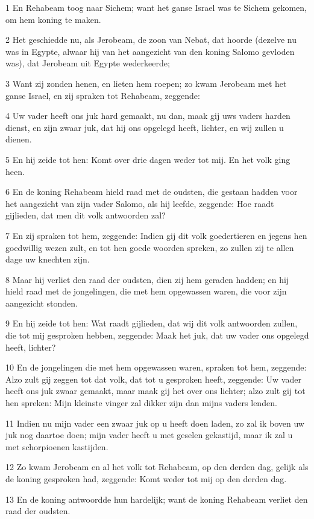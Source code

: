 \par 1 En Rehabeam toog naar Sichem; want het ganse Israel was te Sichem gekomen, om hem koning te maken.
\par 2 Het geschiedde nu, als Jerobeam, de zoon van Nebat, dat hoorde (dezelve nu was in Egypte, alwaar hij van het aangezicht van den koning Salomo gevloden was), dat Jerobeam uit Egypte wederkeerde;
\par 3 Want zij zonden henen, en lieten hem roepen; zo kwam Jerobeam met het ganse Israel, en zij spraken tot Rehabeam, zeggende:
\par 4 Uw vader heeft ons juk hard gemaakt, nu dan, maak gij uws vaders harden dienst, en zijn zwaar juk, dat hij ons opgelegd heeft, lichter, en wij zullen u dienen.
\par 5 En hij zeide tot hen: Komt over drie dagen weder tot mij. En het volk ging heen.
\par 6 En de koning Rehabeam hield raad met de oudsten, die gestaan hadden voor het aangezicht van zijn vader Salomo, als hij leefde, zeggende: Hoe raadt gijlieden, dat men dit volk antwoorden zal?
\par 7 En zij spraken tot hem, zeggende: Indien gij dit volk goedertieren en jegens hen goedwillig wezen zult, en tot hen goede woorden spreken, zo zullen zij te allen dage uw knechten zijn.
\par 8 Maar hij verliet den raad der oudsten, dien zij hem geraden hadden; en hij hield raad met de jongelingen, die met hem opgewassen waren, die voor zijn aangezicht stonden.
\par 9 En hij zeide tot hen: Wat raadt gijlieden, dat wij dit volk antwoorden zullen, die tot mij gesproken hebben, zeggende: Maak het juk, dat uw vader ons opgelegd heeft, lichter?
\par 10 En de jongelingen die met hem opgewassen waren, spraken tot hem, zeggende: Alzo zult gij zeggen tot dat volk, dat tot u gesproken heeft, zeggende: Uw vader heeft ons juk zwaar gemaakt, maar maak gij het over ons lichter; alzo zult gij tot hen spreken: Mijn kleinste vinger zal dikker zijn dan mijns vaders lenden.
\par 11 Indien nu mijn vader een zwaar juk op u heeft doen laden, zo zal ik boven uw juk nog daartoe doen; mijn vader heeft u met geselen gekastijd, maar ik zal u met schorpioenen kastijden.
\par 12 Zo kwam Jerobeam en al het volk tot Rehabeam, op den derden dag, gelijk als de koning gesproken had, zeggende: Komt weder tot mij op den derden dag.
\par 13 En de koning antwoordde hun hardelijk; want de koning Rehabeam verliet den raad der oudsten.
